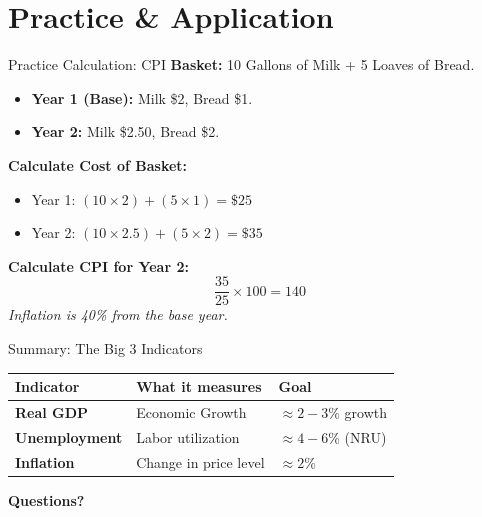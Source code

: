 \documentclass[aspectratio=169, 10pt]{beamer}
\begin{document}
\section{Practice \& Application}

\begin{frame}{Practice Calculation: CPI}
    \textbf{Basket:} 10 Gallons of Milk + 5 Loaves of Bread.
    \begin{itemize}
        \item \textbf{Year 1 (Base):} Milk \$2, Bread \$1.
        \item \textbf{Year 2:} Milk \$2.50, Bread \$2.
    \end{itemize}
    
    \vspace{0.2cm}
    \textbf{Calculate Cost of Basket:}
    \begin{itemize}
        \item Year 1: $(10 \times 2) + (5 \times 1) = \$25$
        \item Year 2: $(10 \times 2.5) + (5 \times 2) = \$35$
    \end{itemize}
    
    \vspace{0.2cm}
    \textbf{Calculate CPI for Year 2:}
    $$ \frac{35}{25} \times 100 = 140 $$
    \textit{Inflation is 40\% from the base year.}
\end{frame}

\begin{frame}{Summary: The Big 3 Indicators}
    \begin{table}[]
    \centering
    \begin{tabular}{|l|l|l|}
    \hline
    \textbf{Indicator} & \textbf{What it measures} & \textbf{Goal} \\ \hline
    \textbf{Real GDP} & Economic Growth & $\approx 2-3\%$ growth \\ \hline
    \textbf{Unemployment} & Labor utilization & $\approx 4-6\%$ (NRU) \\ \hline
    \textbf{Inflation} & Change in price level & $\approx 2\%$ \\ \hline
    \end{tabular}
    \end{table}
\end{frame}

\begin{frame}
    \centering
    \Huge \textbf{Questions?}
\end{frame}
\end{document}
